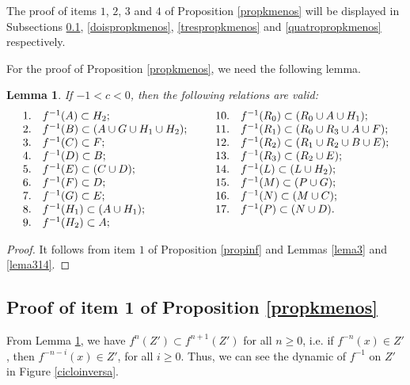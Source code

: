 \documentclass[11pt]{amsart}
\newtheorem{lemma}[theorem]{Lemma}
\theoremstyle{definition}
\begin{document}
The proof of items $1$, $2$, $3$ and $4$ of Proposition \ref{propkmenos} will be displayed in Subsections \ref{umpropkmenos}, \ref{doispropkmenos}, \ref{trespropkmenos} and \ref{quatropropkmenos} respectively.

For the proof of Proposition \ref{propkmenos}, we need the following lemma.

\begin{lemma} If $-1<c<0$, then the following relations are valid:
$$
	\begin{array}{lllll}
	1.	& f^{-1}(A) \subset H_2;                       & \hspace{.2cm}  & 10. & f^{-1}(R_0) \subset  (R_0\cup A\cup H_1);        \\
	2.	& f^{-1}(B) \subset (A\cup G\cup H_1\cup H_2); &           & 11. & f^{-1}(R_1) \subset  (R_0\cup R_3\cup A\cup F);  \\
	3.	& f^{-1}(C) \subset F;                         &                           & 12. & f^{-1}(R_2) \subset  (R_1\cup R_2\cup B\cup E);  \\
	4.	& f^{-1}(D) \subset B;                         &                           & 13. & f^{-1}(R_3) \subset  (R_2\cup E);                \\
	5.	& f^{-1}(E) \subset (C\cup D);                 &                       & 14. & f^{-1}(L) \subset    (L\cup H_2);                \\
	6.	& f^{-1}(F) \subset D;                         &                            & 15. & f^{-1}(M) \subset    (P\cup G);                  \\
	7.	& f^{-1}(G) \subset E;                         &                            & 16. & f^{-1}(N) \subset    (M\cup C);                  \\
	8.	& f^{-1}(H_1) \subset (A\cup H_1);             &                     & 17. & f^{-1}(P) \subset    (N\cup D).                  \\
	9.	& f^{-1}(H_2) \subset A;                       &                           &                   \\
	\end{array}
	$$ \label{prop317}
\end{lemma}
\begin{proof} It follows from item $1$ of Proposition \ref{propinf} and
	Lemmas \ref{lema3} and \ref{lema314}.
\end{proof}

\subsection{Proof of item 1 of Proposition \ref{propkmenos}} \label{umpropkmenos}
From Lemma \ref{prop317}, we have $f^n(Z')\subset f^{n+1}(Z')$ for all $n\geq 0$, i.e. if $f^{-n}(x)\in Z'$, then $f^{-n-i}(x)\in Z'$, for all $i\geq 0$. 
Thus, we can see the dynamic of $f^{-1}$ on $Z'$ in Figure \ref{cicloinversa}.
\end{document}
